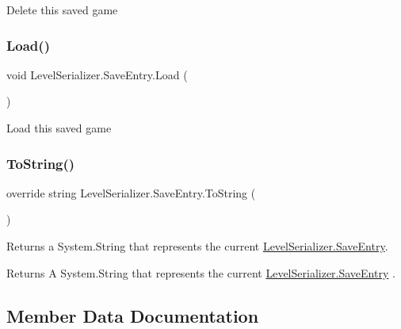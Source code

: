 Delete this saved game 

\mbox{\label{class_level_serializer_1_1_save_entry_aebbbfd37345c0a1b60b9765f483b459a}} 
\subsubsection{\texorpdfstring{Load()}{Load()}}
{\footnotesize\ttfamily void Level\+Serializer.\+Save\+Entry.\+Load (\begin{DoxyParamCaption}{ }\end{DoxyParamCaption})\hspace{0.3cm}{\ttfamily [inline]}}



Load this saved game 

\mbox{\label{class_level_serializer_1_1_save_entry_a643faa4c478ba8fed108000aa3493157}} 
\subsubsection{\texorpdfstring{To\+String()}{ToString()}}
{\footnotesize\ttfamily override string Level\+Serializer.\+Save\+Entry.\+To\+String (\begin{DoxyParamCaption}{ }\end{DoxyParamCaption})\hspace{0.3cm}{\ttfamily [inline]}}



Returns a System.\+String that represents the current \hyperlink{class_level_serializer_1_1_save_entry}{Level\+Serializer.\+Save\+Entry}. 

\begin{DoxyReturn}{Returns}
A System.\+String that represents the current \hyperlink{class_level_serializer_1_1_save_entry}{Level\+Serializer.\+Save\+Entry} . 
\end{DoxyReturn}


\subsection{Member Data Documentation}
\mbox{\label{class_level_serializer_1_1_save_entry_a64e2a1af5594210b57b9f173432a544f}} 
